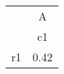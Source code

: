 \begin{tabular}{l*{1}{c}}
\hline\hline
            &           A\\
            &          c1\\
\hline
r1          &        0.42\\
\hline\hline
\end{tabular}
